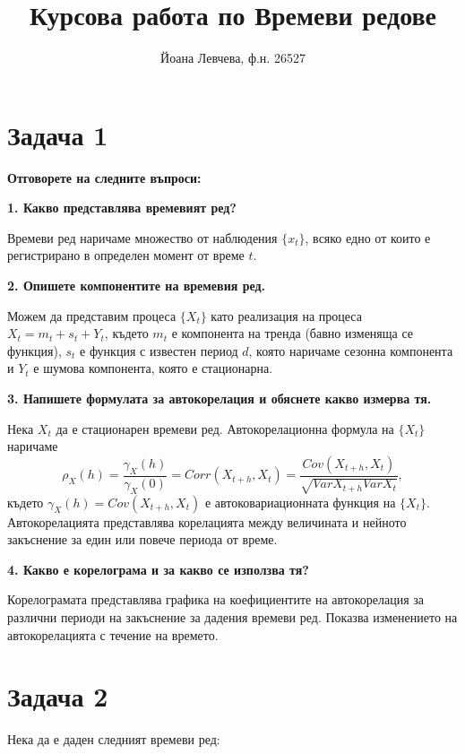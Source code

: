 \documentclass{article}
\title{Курсова работа по Времеви редове}
\author{Йоана Левчева, ф.н. 26527}
\begin{document}
\maketitle

\section*{Задача 1}
\textbf{Отговорете на следните въпроси:}
\begin{flushleft}

\textbf{1. Какво представлява времевият ред?}
\begin{flushleft}
Времеви ред наричаме множество от наблюдения $\{ x_t \}$, всяко едно от които е регистрирано в определен момент от време $t$.
\end{flushleft}

\textbf{2. Опишете компонентите на времевия ред.}
\begin{flushleft}
Можем да представим процеса $\{X_t \}$ като реализация на процеса $X_t = m_t + s_t + Y_t$, където $m_t$ е компонента на тренда (бавно изменяща се функция), $s_t$ е функция с известен период $d$, която наричаме сезонна компонента и $Y_t$ е шумова компонента, която е стационарна.
\end{flushleft}

\textbf{3. Напишете формулата за автокорелация и обяснете какво измерва тя.}
\begin{flushleft}
Нека $X_t$ да е стационарен времеви ред. Автокорелационна формула на $\{X_t \}$ наричаме $$\rho_{X}(h) = \frac{\gamma_{X}(h)}{\gamma_{X}(0)} = Corr(X_{t+h}, X_t) = \frac{Cov(X_{t+h}, X_t)}{\sqrt{Var X_{t+h}Var X_t}},$$ където $\gamma_{X}(h) = Cov(X_{t+h}, X_t)$ е автоковариационната функция на $\{ X_t \}$. Автокорелацията представлява корелацията между величината и нейното закъснение за един или повече периода от време.
\end{flushleft}

\textbf{4. Какво е корелограма и за какво се използва тя?}
\begin{flushleft}
Корелограмата представлява графика на коефициентите на автокорелация за различни периоди на закъснение за дадения времеви ред. Показва изменението на автокорелацията с течение на времето. 
\end{flushleft}

\end{flushleft}

\section*{Задача 2}
Нека да е даден следният времеви ред:
\end{document}
